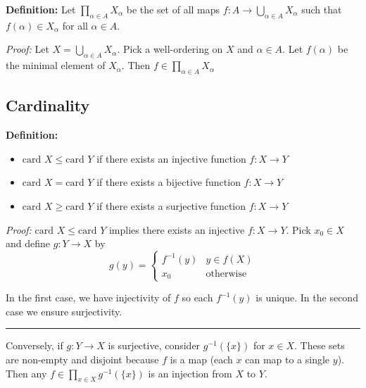 \documentclass[12pt]{report}
\newcommand{\card}{\text{card }}
\renewcommand{\div}{\vspace*{10pt}\hrule\vspace*{10pt}}
\newenvironment*{tbox}[2][gray]{
    \begin{tcolorbox}[
        parbox=false,
        colback=#1!5!white,
        colframe=#1!75!black,
        breakable,
        title={#2}
    ]}
    {\end{tcolorbox}}
\begin{document}
    \textbf{Definition:} Let $\prod_{\alpha \in A} X_{\alpha}$ be the set of all maps $f: A \to \bigcup_{\alpha \in A} X_{\alpha}$ such that $f(\alpha) \in X_{\alpha}$ for all $\alpha \in A$.

    \begin{tbox}{\textbf{Axiom of Choice:} If $\{X_\alpha\}_{\alpha \in A}$ is a nonempty collection of nonempty sets, $\prod_{\alpha \in A} X_{\alpha}$ is nonempty, i.e. there exists at least one choice function $f$ }
        \emph{Proof:} Let $X = \bigcup_{\alpha \in A} X_{\alpha}$. Pick a well-ordering on $X$ and $\alpha \in A$. Let $f(\alpha)$ be the minimal element of $X_{\alpha}$. Then $f \in \prod_{\alpha \in A} X_{\alpha}$ 
    \end{tbox}

    \subsection*{Cardinality} 
        \textbf{Definition:} 
        \begin{itemize}
            \item $\card X \leq \card Y$ if there exists an injective function $f: X \to Y$
            \item $\card X = \card Y$ if there exists a bijective function $f: X \to Y$
            \item $\card X \geq \card Y$ if there exists a surjective function $f: X \to Y$
        \end{itemize}

        \begin{tbox}{\textbf{Property:} $\card X \leq \card Y$ iff $\card Y \geq \card X$}
            \emph{Proof:} $\card X \leq \card Y$ implies there exists an injective $f: X \to Y$. Pick $x_0 \in X$ and define $g: Y \to X$ by 
            \[g(y) = \begin{cases}
                f^{-1}(y) & y \in f(X)\\
                x_0 & \text{otherwise}
            \end{cases}\]
            
            In the first case, we have injectivity of $f$ so each $f^{-1}(y)$ is unique. In the second case we ensure surjectivity. 

            \div 

            Conversely, if $g: Y \to X$ is surjective, consider $g^{-1}(\{x\})$ for $x \in X$. These sets are non-empty and disjoint because $f$ is a map (each $x$ can map to a single $y$). Then any $f \in \prod_{x \in X} g^{-1}(\{x\})$ is an injection from $X$ to $Y$.
        \end{tbox}
\end{document}
